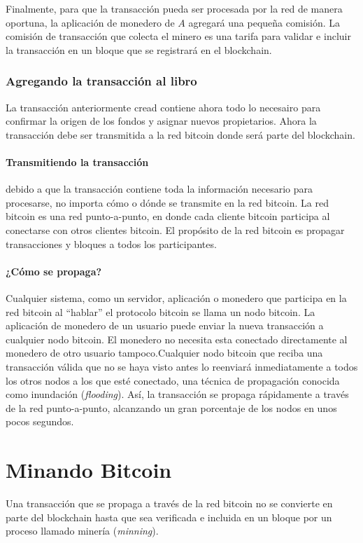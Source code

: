 \documentclass[10pt,journal,compsoc]{IEEEtran}
\begin{document}
Finalmente, para que la transacción pueda ser procesada por la red de manera oportuna, la aplicación de monedero de $A$ agregará una pequeña comisión. La comisión de transacción que colecta el minero es una tarifa para validar e incluir la transacción en un bloque que se registrará en el blockchain.

\subsubsection{Agregando la transacción al libro}
La transacción anteriormente cread contiene ahora todo lo necesairo para confirmar la origen de los fondos y asignar nuevos propietarios. Ahora  la transacción debe ser transmitida a la red bitcoin donde será parte del blockchain. 

\paragraph{Transmitiendo la transacción} debido a que la transacción contiene toda la información necesario para procesarse, no importa cómo o dónde se transmite en la red bitcoin. La red bitcoin es una red punto-a-punto, en donde cada cliente bitcoin participa al conectarse con otros clientes bitcoin. El propósito de la red bitcoin es propagar transacciones y bloques a todos los participantes.

\paragraph{¿Cómo se propaga?} Cualquier sistema, como un servidor, aplicación o monedero que participa en la red bitcoin al ``hablar'' el protocolo bitcoin se llama un nodo bitcoin. La aplicación de monedero de un usuario puede enviar la nueva transacción a cualquier nodo bitcoin. El monedero no necesita esta conectado directamente al monedero de otro usuario tampoco.Cualquier nodo bitcoin que reciba una transacción válida que no se haya visto antes lo reenviará inmediatamente a todos los otros nodos a los que esté conectado, una técnica de propagación conocida como inundación (\emph{flooding}). Así, la transacción se propaga rápidamente a través de la red punto-a-punto, alcanzando un gran porcentaje de los nodos en unos pocos segundos.

\section{Minando Bitcoin}
Una transacción que se propaga a través de la red bitcoin no se convierte en parte del blockchain hasta que sea verificada e incluida en un bloque por un proceso llamado minería (\emph{minning}).
\end{document}
